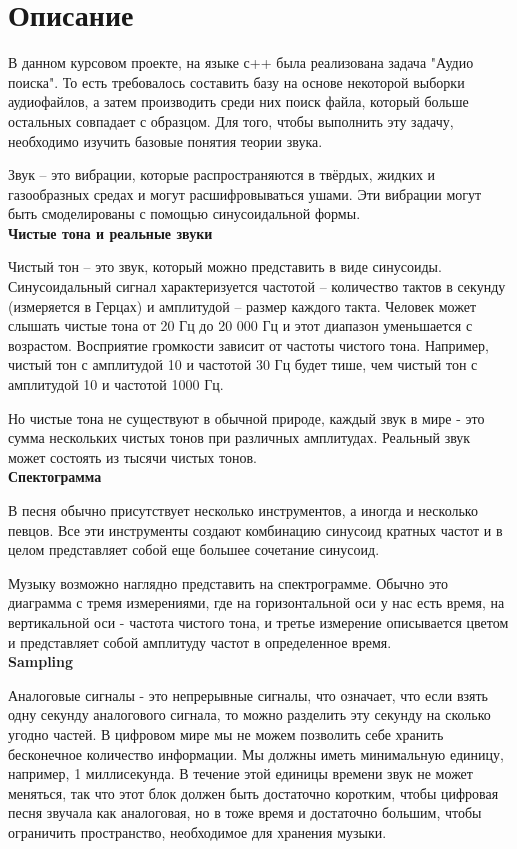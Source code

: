 \section{Описание}

\par В данном курсовом проекте, на языке с++ была реализована задача "Аудио поиска". То есть требовалось составить базу на основе некоторой выборки аудиофайлов, а затем производить среди них поиск файла, который больше остальных совпадает с образцом. Для того, чтобы выполнить эту задачу, необходимо изучить базовые понятия теории звука. 

Звук -- это вибрации, которые распространяются в твёрдых, жидких и газообразных средах и могут расшифровываться ушами. Эти вибрации могут быть смоделированы с помощью синусоидальной формы.\\

\noindent \textbf{Чистые тона и реальные звуки}

Чистый тон -- это звук, который можно представить в виде синусоиды.
Синусоидальный сигнал характеризуется частотой -- количество тактов в секунду (измеряется в Герцах) и амплитудой -- размер каждого такта. Человек может слышать чистые тона от 20 Гц до 20 000 Гц и этот диапазон уменьшается с возрастом. Восприятие громкости зависит от частоты чистого тона. Например, чистый тон с амплитудой 10 и частотой 30 Гц будет тише, чем чистый тон с амплитудой 10 и частотой 1000 Гц.

Но чистые тона не существуют в обычной природе, каждый звук в мире - это сумма нескольких чистых тонов при различных амплитудах. Реальный звук может состоять из тысячи чистых тонов.\\

\noindent \textbf{Спектограмма}

В песня обычно присутствует несколько инструментов, а иногда и несколько певцов. Все эти инструменты создают комбинацию синусоид кратных частот и в целом представляет собой еще большее сочетание синусоид.

Музыку возможно наглядно представить на спектрограмме. Обычно это диаграмма с тремя измерениями, где на горизонтальной оси у нас есть время, на вертикальной оси - частота чистого тона, и третье измерение описывается цветом и представляет собой амплитуду частот в определенное время.\\

\noindent \textbf{Sampling}

Аналоговые сигналы - это непрерывные сигналы, что означает, что если взять одну секунду аналогового сигнала, то можно разделить эту секунду на сколько угодно частей. В цифровом мире мы не можем позволить себе хранить бесконечное количество информации. Мы должны иметь минимальную единицу, например, 1 миллисекунда. В течение этой единицы времени звук не может меняться, так что этот блок должен быть достаточно коротким, чтобы цифровая песня звучала как аналоговая, но в тоже время и достаточно большим, чтобы ограничить пространство, необходимое для хранения музыки. 

